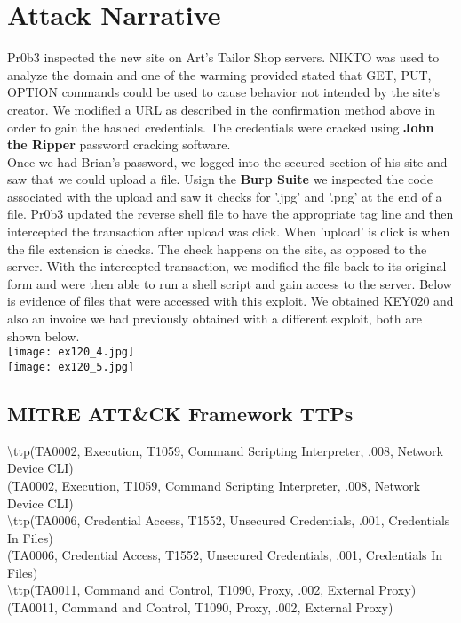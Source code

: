 \documentclass[notitlepage]{article}
\begin{document}
	\section{Attack Narrative}
	
	\indent Pr0b3 inspected the new site on Art's Tailor Shop servers.  NIKTO was used to analyze the domain and one of the warming provided stated that GET, PUT, OPTION commands could be used to cause behavior not intended by the site's creator. We modified a URL as described in the confirmation method above in order to gain the hashed credentials.  The credentials were cracked using \textbf{John the Ripper} password cracking software.  \\
	\indent Once we had Brian's password, we logged into the secured section of his site and saw that we could upload a file.  Usign the \textbf{Burp Suite} we inspected the code associated with the upload and saw it checks for '.jpg' and '.png' at the end of a file. Pr0b3 updated the reverse shell file to have the appropriate tag line and then intercepted the transaction after upload was click. When 'upload' is click is when the file extension is checks. The check happens on the site, as opposed to the server. With the intercepted transaction, we modified the file back to its original form and were then able to run a shell script and gain access to the server. Below is evidence of files that were accessed with this exploit. 
	We obtained KEY020 and also an invoice we had previously obtained with a different exploit, both are shown below. \\ 
		\texttt{[image: ex120\_4.jpg]} \\
		\texttt{[image: ex120\_5.jpg]} \\
	
	
	
	\subsection{MITRE ATT{\&}CK Framework TTPs}
	
	\indent\textbackslash ttp(TA0002, Execution, T1059, Command Scripting Interpreter, .008, Network Device CLI) \\
	\ttp(TA0002, Execution, T1059, Command Scripting Interpreter, .008, Network Device CLI) \\
	
	\indent\textbackslash ttp(TA0006, Credential Access, T1552, Unsecured Credentials, .001, Credentials In Files) \\
	\ttp(TA0006, Credential Access, T1552, Unsecured Credentials, .001, Credentials In Files) \\
	
	\indent\textbackslash ttp(TA0011, Command and Control, T1090, Proxy, .002, External Proxy) \\
	\ttp(TA0011, Command and Control, T1090, Proxy, .002, External Proxy) \\
\end{document}
